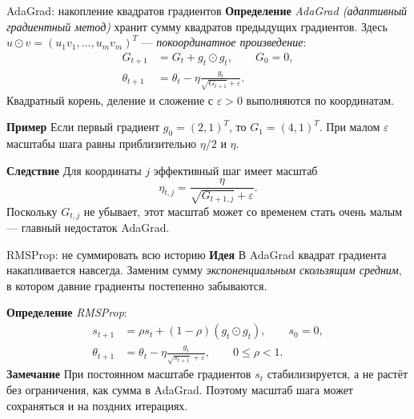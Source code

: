 \documentclass[10pt]{beamer}
\newcommand{\mlBody}{\normalsize}
\newcommand{\mlDefinition}{\textcolor{defblue}{\bfseries Определение}}
\newcommand{\mlRemark}{\textcolor{defblue}{\bfseries Замечание}}
\newcommand{\mlConsequence}{\textcolor{defblue}{\bfseries Следствие}}
\newcommand{\mlIdea}{\textcolor{defblue}{\bfseries Идея}}
\newcommand{\mlExample}{\textcolor{defblue}{\bfseries Пример}}
\begin{document}
\begin{frame}{AdaGrad: накопление квадратов градиентов}
    \mlBody
    \mlDefinition\; \textit{AdaGrad (адаптивный градиентный метод)}
    хранит сумму квадратов предыдущих градиентов.
    Здесь $u\odot v=(u_1v_1,\ldots,u_mv_m)^T$ ---
    \textit{покоординатное произведение}:
    \[
    \begin{aligned}
        G_{t+1}&=G_t+g_t\odot g_t,\qquad G_0=0,\\
        \theta_{t+1}&=\theta_t-\eta
        \frac{g_t}{\sqrt{G_{t+1}}+\varepsilon}.
    \end{aligned}
    \]
    Квадратный корень, деление и сложение с $\varepsilon>0$
    выполняются по координатам.

    \mlExample\; Если первый градиент $g_0=(2,1)^T$,
    то $G_1=(4,1)^T$. При малом $\varepsilon$ масштабы шага
    равны приблизительно $\eta/2$ и $\eta$.

    \mlConsequence\; Для координаты $j$ эффективный шаг имеет масштаб
    \[
       \eta_{t,j}=\frac{\eta}{\sqrt{G_{t+1,j}}+\varepsilon}.
    \]
    Поскольку $G_{t,j}$ не убывает, этот масштаб может со временем
    стать очень малым --- главный недостаток AdaGrad.
\end{frame}

\begin{frame}{RMSProp: не суммировать всю историю}
    \mlBody
    \mlIdea\; В AdaGrad квадрат градиента накапливается навсегда.
    Заменим сумму \emph{экспоненциальным скользящим средним},
    в котором давние градиенты постепенно забываются.

    \mlDefinition\; \textit{RMSProp}:
    \[
    \begin{aligned}
        s_{t+1}&=\rho s_t+(1-\rho)(g_t\odot g_t),
        \qquad s_0=0,\\
        \theta_{t+1}&=\theta_t-
        \eta\frac{g_t}{\sqrt{s_{t+1}}+\varepsilon},
        \qquad 0\le\rho<1.
    \end{aligned}
    \]
    \mlRemark\; При постоянном масштабе градиентов $s_t$
    стабилизируется, а не растёт без ограничения,
    как сумма в AdaGrad. Поэтому масштаб шага может сохраняться и на поздних итерациях.
\end{frame}
\end{document}
